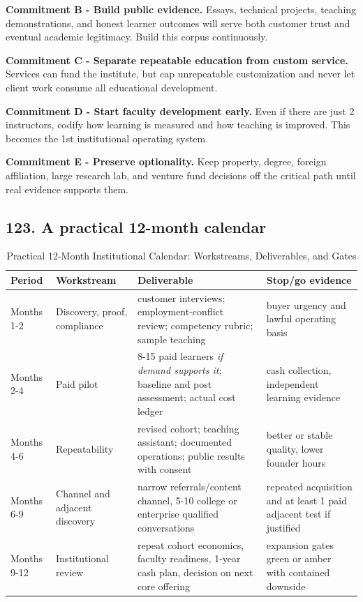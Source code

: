 \textbf{Commitment B - Build public evidence.} Essays, technical projects, teaching demonstrations, and honest learner outcomes will serve both customer trust and eventual academic legitimacy. Build this corpus continuously.

\textbf{Commitment C - Separate repeatable education from custom service.} Services can fund the institute, but cap unrepeatable customization and never let client work consume all educational development.

\textbf{Commitment D - Start faculty development early.} Even if there are just 2 instructors, codify how learning is measured and how teaching is improved. This becomes the 1st institutional operating system.

\textbf{Commitment E - Preserve optionality.} Keep property, degree, foreign affiliation, large research lab, and venture fund decisions off the critical path until real evidence supports them.

\subsection{123. A practical 12-month calendar}

\begin{table}[t]
\centering
\small
\caption{Practical 12-Month Institutional Calendar: Workstreams, Deliverables, and Gates}
\label{tab:ch36_twelve_month_calendar}
\begin{tabularx}{\textwidth}{p{2.2cm} p{3.5cm} p{4.5cm} X}
\toprule
\textbf{ Period } & \textbf{ Workstream } & \textbf{ Deliverable } & \textbf{ Stop/\allowbreak go evidence } \\
\midrule
 Months 1-2  &  Discovery, proof, compliance  &  customer interviews; employment-conflict review; competency rubric; sample teaching  &  buyer urgency and lawful operating basis  \\
 Months 2-4  &  Paid pilot  &  8-15 paid learners \textit{if demand supports it}; baseline and post assessment; actual cost ledger  &  cash collection, independent learning evidence  \\
 Months 4-6  &  Repeatability  &  revised cohort; teaching assistant; documented operations; public results with consent  &  better or stable quality, lower founder hours  \\
 Months 6-9  &  Channel and adjacent discovery  &  narrow referrals/\allowbreak content channel, 5-10 college or enterprise qualified conversations  &  repeated acquisition and at least 1 paid adjacent test if justified  \\
 Months 9-12  &  Institutional review  &  repeat cohort economics, faculty readiness, 1-year cash plan, decision on next core offering  &  expansion gates green or amber with contained downside  \\
\bottomrule
\end{tabularx}
\end{table}

